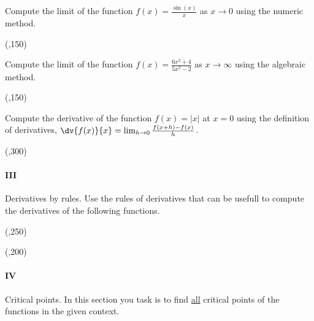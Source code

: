 \begin{preguntas}
\pregunta[5] Compute the limit of the function \(f(x) = \frac{\sin(x)}{x}\) as $x\to0$ using the numeric method. 

\begin{center}
    \framebox(\textwidth,150){}   
\end{center}

\pregunta[5] Compute the limit of the function \(f(x) = \frac{6x^2 + 4}{5x^2 - 2}\) as $x\to\infty$ using the algebraic method.

\begin{center}
    \framebox(\textwidth,150){} 
\end{center}
\newpage

\pregunta[5] Compute the derivative of the function \( f(x) = |x| \) at $x=0$ using the definition of derivatives, \(\dv{f(x)}{x} = \lim_{h\to0}\frac{f(x+h) - f(x)}{h}\).

\begin{center}
    \framebox(\textwidth,300){} 
\end{center}


\end{preguntas}


\paragraph{III} Derivatives by rules.
Use the rules of derivatives that can be usefull to compute the derivatives of the following functions. 

\begin{preguntas}


\begin{center}
    \framebox(\textwidth,250){} 
\end{center}

\newpage


\begin{center}
    \framebox(\textwidth,200){} 
\end{center}

\end{preguntas}

\paragraph{IV} Critical points.
In this section you task is to find \underline{all} critical points of the functions in the given context.

